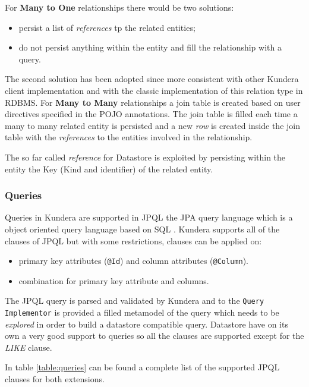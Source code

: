 \noindent For \textbf{Many to One} relationships there would be two solutions:
\begin{itemize}
\item persist a list of \textit{references} tp the related entities;
\item do not persist anything within the entity and fill the relationship with a query.
\end{itemize}
The second solution has been adopted since more consistent with other Kundera client implementation and with the classic implementation of this relation type in RDBMS.
\noindent For \textbf{Many to Many} relationships a join table is created based on user directives specified in the POJO annotations. The join table is filled each time a many to many related entity is persisted and a new \textit{row} is created inside the join table with the \textit{references} to the entities involved in the relationship.

\noindent The so far called \textit{reference} for Datastore is exploited by persisting within the entity the Key (Kind and identifier) of the related entity.

\subsubsection{Queries}
Queries in Kundera are supported in JPQL the JPA query language which is a  object oriented query language based on SQL \cite{book:projpa2}.
Kundera supports all of the clauses of JPQL but with some restrictions, clauses can be applied on:
\begin{itemize}
\item primary key attributes (\texttt{@Id}) and column attributes (\texttt{@Column}).
\item combination for primary key attribute and columns.
\end{itemize}

\newparagraph The JPQL query is parsed and validated by Kundera and to the \texttt{Query Implementor} is provided a filled metamodel of the query which needs to be \textit{explored} in order to build a datastore compatible query.    
Datastore have on its own a very good support to queries so all the clauses are supported except for the \textit{LIKE} clause.

\noindent In table \ref{table:queries} can be found a complete list of the supported JPQL clauses for both extensions.

